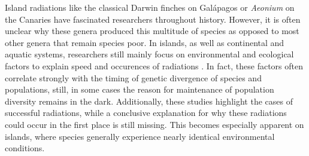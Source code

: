 \documentclass[a4paper]{scrartcl}
\begin{document}
Island radiations like the classical Darwin finches on Galápagos or \textit{Aeonium} on the Canaries have fascinated researchers throughout history. %
However, it is often unclear why these genera produced this multitude of species as opposed to most other genera that remain species poor.
In islands, as well as continental and aquatic systems, researchers still mainly focus on environmental and ecological factors to explain speed and occurences of radiations \cite{krugSpeciesGenusRatios2008}\cite{hurlbertProcessesGeneratingLatitudinal2014}\cite{willisSpeciesDiversityScale2002}. %
In fact, these factors often correlate strongly with the timing of genetic divergence of species and populations, %
still, in some cases the reason for maintenance of population diversity remains in the dark. \cite{chenConcordanceGeneticDiversity}
Additionally, these studies highlight the cases of successful radiations, while a conclusive explanation for why these radiations could occur in the first place is still missing.
This becomes especially apparent on islands, where species generally experience nearly identical environmental conditions.%
\end{document}

